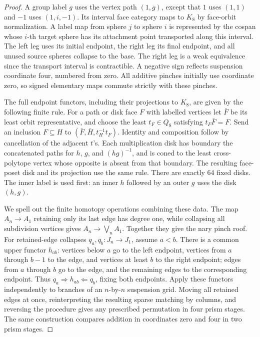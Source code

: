 \begin{proof}
A group label $g$ uses the vertex path $(1,g)$, except that $1$ uses
$(1,1)$ and $-1$ uses $(1,i,-1)$. Its interval face category maps
to $K_8$ by face-orbit normalization. A label map from sphere $j$
to sphere $i$ is represented by the cospan whose $i$-th target sphere
has its attachment point transported along this interval. The left
leg uses its initial endpoint, the right leg its final endpoint, and
all unused source spheres collapse to the base. The right leg is a
weak equivalence since the transport interval is contractible.
A negative sign reflects suspension coordinate four, numbered from
zero. All additive pinches initially use coordinate zero, so signed
elementary maps commute strictly with these pinches.

The full endpoint functors, including their projections to $K_8$,
are given by the following finite rule. For a path or disk face $F$
with labelled vertices let $\bar F$ be its least orbit representative,
and choose the least $t_F\in Q_8$ satisfying $t_F\bar F=F$.
Send an inclusion $F\subseteq H$ to
$(\bar F,\bar H,t_H^{-1}t_F)$. Identity and composition follow by
cancellation of the adjacent $t$'s. Each multiplication disk has
boundary the concatenated paths for $h$, $g$, and $(hg)^{-1}$,
and is coned to the least cross-polytope vertex whose opposite is
absent from that boundary. The resulting face-poset disk and its
projection use the same rule. There are exactly 64 fixed disks.
The inner label is used first: an inner $h$ followed by an outer
$g$ uses the disk $(h,g)$.

We spell out the finite homotopy operations combining these data.
The map $A_n\to A_1$ retaining only its last edge has degree one,
while collapsing all subdivision vertices gives
$A_n\to\bigvee_n A_1$. Together they give the nary pinch roof.
For retained-edge collapses $q_a,q_b:J_n\to J_1$, assume $a<b$.
There is a common upper functor $h_{ab}$: vertices below $a$ go
to the left endpoint, vertices from $a$ through $b-1$ to the
edge, and vertices at least $b$ to the right endpoint; edges from
$a$ through $b$ go to the edge, and the remaining edges to the
corresponding endpoint. Thus
$q_a\Rightarrow h_{ab}\Leftarrow q_b$, fixing both endpoints.
Apply these functors independently to branches of an
$n$-by-$n$ suspension grid. Moving all retained edges at once,
reinterpreting the resulting sparse matching by columns, and
reversing the procedure gives any prescribed permutation in four
prism stages. The same construction compares addition in
coordinates zero and four in two prism stages.


\end{proof}
